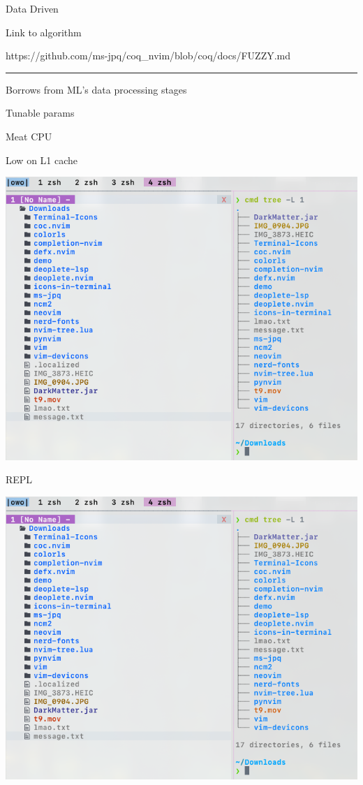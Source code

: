 \documentclass{beamer}
\begin{document}
\begin{frame}{Data Driven}

	Link to algorithm

	https://github.com/ms-jpq/coq\_nvim/blob/coq/docs/FUZZY.md

	\rule{\textwidth}{0.1em}

	Borrows from ML's data processing stages

	Tunable params

\end{frame}


\begin{frame}{Meat CPU}

	Low on L1 cache

	\includegraphics[width=\textwidth]{chadtree_ls}

\end{frame}


\begin{frame}{REPL}

	\includegraphics[width=\textwidth]{chadtree_ls}

\end{frame}
\end{document}
